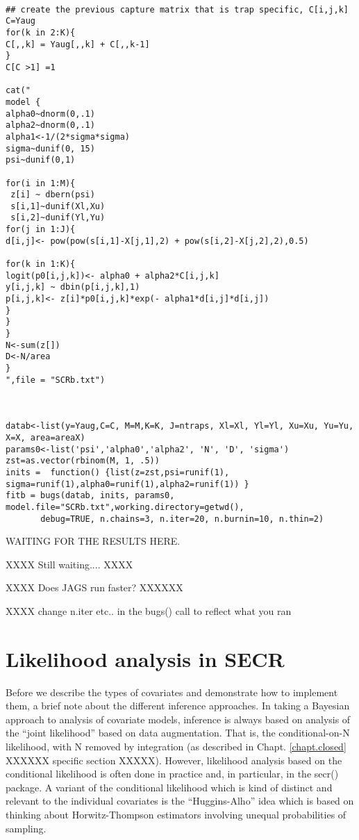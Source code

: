 {\small
\begin{verbatim}

## create the previous capture matrix that is trap specific, C[i,j,k]
C=Yaug
for(k in 2:K){
C[,,k] = Yaug[,,k] + C[,,k-1]
}
C[C >1] =1

cat("
model {
alpha0~dnorm(0,.1)
alpha2~dnorm(0,.1)
alpha1<-1/(2*sigma*sigma)
sigma~dunif(0, 15)
psi~dunif(0,1)

for(i in 1:M){
 z[i] ~ dbern(psi)
 s[i,1]~dunif(Xl,Xu)
 s[i,2]~dunif(Yl,Yu)
for(j in 1:J){
d[i,j]<- pow(pow(s[i,1]-X[j,1],2) + pow(s[i,2]-X[j,2],2),0.5)

for(k in 1:K){
logit(p0[i,j,k])<- alpha0 + alpha2*C[i,j,k]
y[i,j,k] ~ dbin(p[i,j,k],1)
p[i,j,k]<- z[i]*p0[i,j,k]*exp(- alpha1*d[i,j]*d[i,j])
}
}
}
N<-sum(z[])
D<-N/area
}
",file = "SCRb.txt")



datab<-list(y=Yaug,C=C, M=M,K=K, J=ntraps, Xl=Xl, Yl=Yl, Xu=Xu, Yu=Yu, X=X, area=areaX)
params0<-list('psi','alpha0','alpha2', 'N', 'D', 'sigma')
zst=as.vector(rbinom(M, 1, .5))
inits =  function() {list(z=zst,psi=runif(1), sigma=runif(1),alpha0=runif(1),alpha2=runif(1)) }
fitb = bugs(datab, inits, params0, model.file="SCRb.txt",working.directory=getwd(),    
       debug=TRUE, n.chains=3, n.iter=20, n.burnin=10, n.thin=2)

\end{verbatim}
}


WAITING FOR THE RESULTS HERE.  

XXXX  Still waiting.... XXXX

XXXX Does JAGS run faster? XXXXXX

XXXX change n.iter etc.. in the bugs() call to reflect what you ran




\section{Likelihood analysis in SECR}

Before we describe the types of covariates and demonstrate how to
implement them, a brief note about the different inference approaches.
In taking a Bayesian approach to analysis of covariate models,
inference is always based on analysis of the ``joint likelihood''
based on data augmentation. That is, the conditional-on-N likelihood,
with N removed by integration (as described in
Chapt. \ref{chapt.closed} XXXXXX specific section XXXXX).
However, likelihood analysis
based on the conditional likelihood is often done in practice and, in
particular, in the secr() package.  A variant of the conditional
likelihood which is kind of distinct and relevant to the individual
covariates is the ``Huggins-Alho'' idea which is based on thinking
about Horwitz-Thompson estimators involving unequal probabilities of
sampling. 



